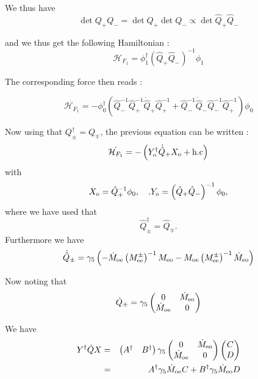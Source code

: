 \documentclass{article}[12pt]
\begin{document}
We thus have 
\begin{equation}
\det{Q_+ Q_-} = \det{Q_+}\det{Q_{-}}\propto\det{\hat{Q}_+ \hat{Q}_-} 
\end{equation}

and we thus get the following Hamiltonian :
\begin{equation}
\mathcal{H}_{F_1} = \phi_1^{\dagger} \left(\hat{Q}_+
    \hat{Q}_-\right)^{-1} \phi_1
\end{equation} 

The corresponding force then reads :

\begin{equation}
\dot{\mathcal{H}_{F_1}} = - \phi_{0}^\dagger\left(    \hat{Q}_-^{-1}
  \hat{Q}_+^{-1}  \dot{\hat{Q}}_+  \hat{Q}_+^{-1}  + \hat{Q}_{-}^{-1}
  \dot{\hat{Q}}_{-}  \hat{Q}_-^{-1}   \hat{Q}_+^{-1}    \right)    \phi_0
\end{equation}

Now using that   $Q_{\pm} ^{\dagger} = Q_{\mp}$, the previous equation
can be written :
\begin{equation}
\dot{\mathcal{H}_{F_1}} = - \left(Y_{\rm{o}}^{\dagger} \dot{\hat{Q}}_{+} X_{\rm{o}}  + \rm{h.c}\right)
\end{equation}
with 
\begin{equation}
  X_{\rm{o}}=\hat{Q}_+^{-1}\phi_0,\quad. Y_{\rm{o}}= \left(\hat{Q}_+
    \hat{Q}_-\right)^{-1} \phi_0,
\end{equation}
where we have used that 
\begin{equation}
  \hat{Q}_\pm^{\dagger} = \hat{Q}_\mp.
\end{equation}
Furthermore we have 
\begin{equation}
\dot{\hat{Q}}_{\pm} =  \gamma_5 \left( -  \dot{M}_{\rm{oe}}
  \left(M^{\pm}_{\rm{ee}}\right)^{-1} M_{\rm{eo}} -  M_{\rm{oe}}
    \left(M^{\pm}_{\rm{ee}}\right)^{-1} \dot{M}_{\rm{eo}}\right)
\end{equation}

Now noting that  
\begin{equation}
  \dot{Q}_{\pm} =  \gamma_5 \begin{pmatrix} 
 0  & \dot{M}_{\rm{eo}} \\
\dot{M}_{\rm{oe}} & 0\\
\end{pmatrix}
\end{equation}

We have 
\begin{eqnarray}
  Y ^{\dagger} \dot{Q} X  &=& \begin{pmatrix} A^\dagger &
    B^\dagger \end{pmatrix} \gamma_5 \begin{pmatrix} 
 0  & \dot{M}_{\rm{eo}} \\
\dot{M}_{\rm{oe}} & 0\\
\end{pmatrix}  \begin{pmatrix} C \\  D \end{pmatrix} \\
&=&  A^\dagger \gamma_5 \dot{M}_{\rm{oe}}  C + B^\dagger \gamma_5 \dot{M}_{\rm{eo}} D
\end{eqnarray}
\end{document}
